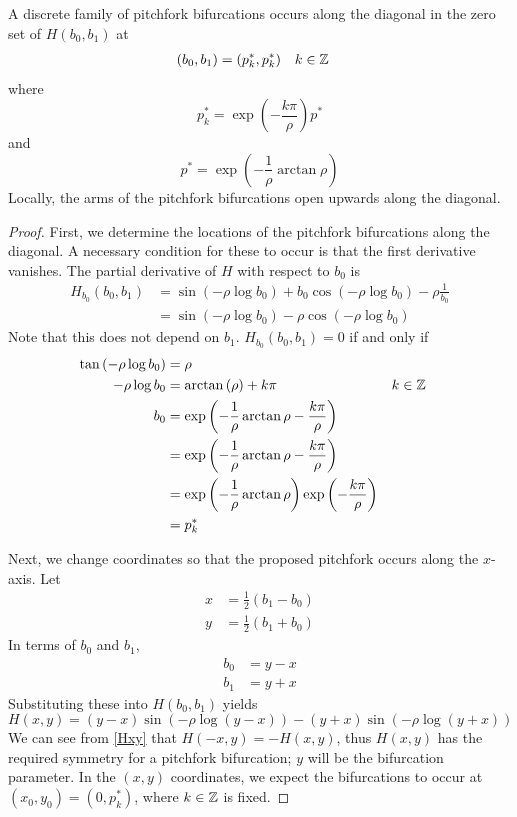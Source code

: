 \documentclass[thesis.tex]{subfiles}
\begin{document}
\begin{lemma}\label{pitchforkH}
A discrete family of pitchfork bifurcations occurs along the diagonal in the zero set of $H(b_0, b_1)$ at 
\begin{align*}
(b_0, b_1) &= (p_k^*, p_k^*) && k \in {\mathbb Z}
\end{align*}
where 
\begin{equation}\label{pkstar}
p^*_k = \exp\left(-\frac{k \pi}{\rho} \right) p^*
\end{equation}
and 
\begin{equation}\label{pstar}
p^* = \exp \left( -\frac{1}{\rho} \arctan \rho \right)
\end{equation}
Locally, the arms of the pitchfork bifurcations open upwards along the diagonal.
\begin{proof}
First, we determine the locations of the pitchfork bifurcations along the diagonal. A necessary condition for these to occur is that the first derivative vanishes. The partial derivative of $H$ with respect to $b_0$ is
\begin{align*}
H_{b_0}(b_0, b_1) &= 
\sin \left( -\rho \log b_0 \right)
+ b_0 \cos \left( - \rho \log b_0 \right)- \rho \frac{1}{b_0} \\
&= \sin \left( - \rho \log b_0 \right) - \rho \cos \left( - \rho \log b_0 \right)
\end{align*}
Note that this does not depend on $b_1$. $H_{b_0}(b_0, b_1) = 0$ if and only if
\begin{align*}
\tan \left( -\rho \log b_0 \right) &=  \rho \\
-\rho \log b_0 &= \arctan \left( \rho\right) + k \pi && k \in {\mathbb Z} \\ 
b_0 &= \exp \left( -\frac{1}{\rho} \arctan \rho - \frac{k \pi}{\rho} \right) \\
&= \exp \left( -\frac{1}{\rho} \arctan \rho - \frac{k \pi}{\rho} \right)  \\
&= \exp \left( -\frac{1}{\rho} \arctan \rho \right) \exp \left( - \frac{k \pi}{\rho} \right) \\
&= p_k^*
\end{align*}

Next, we change coordinates so that the proposed pitchfork occurs along the $x$-axis. Let
\begin{align*}
x &= \frac{1}{2}(b_1 - b_0) \\
y &= \frac{1}{2}(b_1 + b_0)
\end{align*}
In terms of $b_0$ and $b_1$,
\begin{align*}
b_0 &= y - x \\
b_1 &= y + x
\end{align*}
Substituting these into $H(b_0, b_1)$ yields
\begin{equation}\label{Hxy}
H(x, y) = 
(y - x) \sin \left( -\rho \log(y - x) \right) - (y + x) \sin \left( - \rho \log (y + x) \right)
\end{equation}
We can see from \eqref{Hxy} that $H(-x, y) = -H(x, y)$, thus $H(x,y)$ has the required symmetry for a pitchfork bifurcation; $y$ will be the bifurcation parameter. In the $(x,y)$ coordinates, we expect the bifurcations to occur at $(x_0, y_0) = \left(0, p^*_k \right)$, where $k \in {\mathbb Z}$ is fixed.


\end{proof}
\end{lemma}
\end{document}
